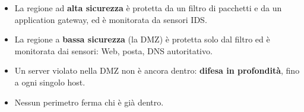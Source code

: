 \begin{itemize}
    \item La regione ad \textbf{alta sicurezza} è protetta da un filtro di pacchetti e da un application gateway, ed è monitorata da sensori IDS.
    \item La regione a \textbf{bassa sicurezza} (la DMZ) è protetta solo dal filtro ed è monitorata dai sensori: Web, posta, DNS autoritativo.
    \item Un server violato nella DMZ non è ancora dentro: \textbf{difesa in profondità}, fino a ogni singolo host.
    \item Nessun perimetro ferma chi è già dentro.
\end{itemize}


